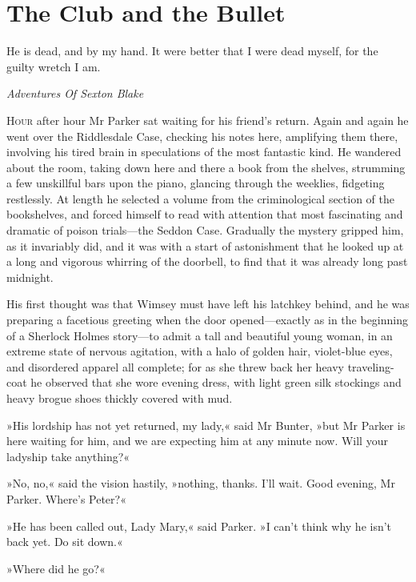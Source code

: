 


\chapter{The Club and the Bullet}

\epigraph{He is dead, and by my hand. It were better that I were dead myself, for the guilty wretch I am.}{\textit{Adventures Of Sexton Blake}}


\lettrine[lines=4]{H}{our} after hour Mr Parker sat waiting for his friend's return. Again and again he went over the Riddlesdale Case, checking his notes here, amplifying them there, involving his tired brain in speculations of the most fantastic kind. He wandered about the room, taking down here and there a book from the shelves, strumming a few unskillful bars upon the piano, glancing through the weeklies, fidgeting restlessly.  At length he selected a volume from the criminological section of the bookshelves, and forced himself to read with attention that most fascinating and dramatic of poison trials\allowbreak---\allowbreak the Seddon Case. Gradually the mystery gripped him, as it invariably did, and it was with a start of astonishment that he looked up at a long and vigorous whirring of the doorbell, to find that it was already long past midnight.

His first thought was that Wimsey must have left his latchkey behind, and he was preparing a facetious greeting when the door opened\allowbreak---\allowbreak exactly as in the beginning of a Sherlock Holmes story\allowbreak---\allowbreak to admit a tall and beautiful young woman, in an extreme state of nervous agitation, with a halo of golden hair, violet-blue eyes, and disordered apparel all complete; for as she threw back her heavy traveling-coat he observed that she wore evening dress, with light green silk stockings and heavy brogue shoes thickly covered with mud.

»His lordship has not yet returned, my lady,« said Mr Bunter, »but Mr  Parker is here waiting for him, and we are expecting him at any minute now. Will your ladyship take anything?«

»No, no,« said the vision hastily, »nothing, thanks. I'll wait. Good evening, Mr Parker. Where's Peter?«

»He has been called out, Lady Mary,« said Parker. »I can't think why he isn't back yet. Do sit down.«

»Where did he go?«

